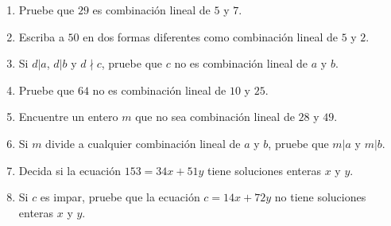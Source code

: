 \documentclass[11pt]{article}
\begin{document}
\begin{enumerate}[label=1.\arabic*]
  \item  Pruebe que $29$ es combinación lineal de $5$ y $7$.
  \item Escriba a $50$ en dos formas diferentes como combinación lineal de $5$ y $2$.
  \item Si $d|a$, $d|b$ y $d \nmid c$, pruebe que $c$ no es combinación lineal de $a$ y $b$.
  \item Pruebe que $64$ no es combinación lineal de $10$ y $25$.
  \item Encuentre un entero $m$ que no sea combinación lineal de $28$ y $49$.
  \item Si $m$ divide a cualquier combinación lineal de $a$ y $b$, pruebe que $m|a$ y $m|b$.
  \item Decida si la ecuación $153=34x+51y$ tiene soluciones enteras $x$ y $y$.
  \item Si $c$ es impar, pruebe que la ecuación $c=14x+72y$ no tiene soluciones enteras $x$ y $y$.
\end{enumerate}
\end{document}
